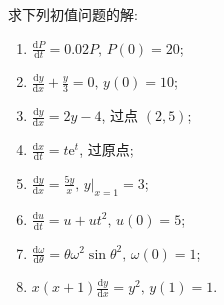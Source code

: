 \documentclass[lang=cn,11pt]{elegantbook}
\begin{document}
\begin{exercise}[求解方程]
求下列初值问题的解:
\begin{enumerate}
    \item[(1)] $\displaystyle \frac{\mathrm{d}P}{\mathrm{d}t}=0.02P,\,P(0)=20$;
    \item[(2)] $\displaystyle \frac{\mathrm{d}y}{\mathrm{d}x}+\frac{y}{3}=0,\,y(0)=10$;
    \item[(3)] $\displaystyle \frac{\mathrm{d}y}{\mathrm{d}x}=2y-4$, 过点 $(2,5)$;
    \item[(4)] $\displaystyle \frac{\mathrm{d}x}{\mathrm{d}t}=t\mathrm{e}^t$, 过原点;
    \item[(5)] $\displaystyle \frac{\mathrm{d}y}{\mathrm{d}x}=\frac{5y}{x},\,y\big|_{x=1}=3$;
    \item[(6)] $\displaystyle \frac{\mathrm{d}u}{\mathrm{d}t}=u+ut^2,\,u(0)=5$;
    \item[(7)] $\displaystyle \frac{\mathrm{d}\omega}{\mathrm{d}\theta}=\theta\omega^2\sin\theta^2,\,\omega(0)=1$;
    \item[(8)] $\displaystyle x(x+1)\frac{\mathrm{d}y}{\mathrm{d}x}=y^2,\,y(1)=1$.
\end{enumerate}
\end{exercise}
\end{document}
